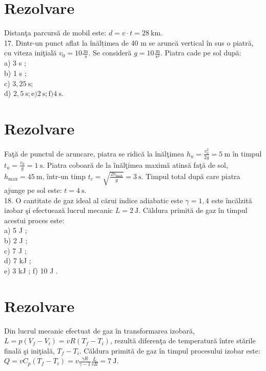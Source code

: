 \section*{Rezolvare}
Distanţa parcursă de mobil este: $d=v \cdot t=28 \mathrm{~km}$.\\
17. Dintr-un punct aflat la înălțimea de 40 m se aruncă vertical în sus o piatră, cu viteza iniţială $v_{0}=10 \frac{\mathrm{~m}}{\mathrm{~s}}$. Se consideră $g=10 \frac{\mathrm{~m}}{\mathrm{~s}^{2}}$. Piatra cade pe sol după:\\
a) 3 s ;\\
b) 1 s ;\\
c) $3,25 \mathrm{~s}$;\\
d) $2,5 \mathrm{~s} ; \mathrm{e}) 2 \mathrm{~s} ; \mathrm{f}) 4 \mathrm{~s}$.

\section*{Rezolvare}
Faţă de punctul de aruncare, piatra se ridică la înălţimea $h_{u}=\frac{v_{0}^{2}}{2 g}=5 \mathrm{~m}$ în timpul $t_{u}=\frac{v_{0}}{g}=1 \mathrm{~s}$. Piatra coboară de la înălţimea maximă atinsă faţă de sol, $h_{\max }=45 \mathrm{~m}$, într-un timp $t_{c}=\sqrt{\frac{2 h_{\max }}{g}}=3 \mathrm{~s}$. Timpul total după care piatra ajunge pe sol este: $t=4 \mathrm{~s}$.\\
18. O cantitate de gaz ideal al cărui indice adiabatic este $\gamma=1,4$ este încălzită izobar şi efectuează lucrul mecanic $L=2 \mathrm{~J}$. Căldura primită de gaz în timpul acestui proces este:\\
a) 5 J ;\\
b) 2 J ;\\
c) 7 J ;\\
d) 7 kJ ;\\
e) 3 kJ ; f) 10 J .

\section*{Rezolvare}
Din lucrul mecanic efectuat de gaz în transformarea izobară, $L=p\left(V_{f}-V_{i}\right)=v R\left(T_{f}-T_{i}\right)$, rezultă diferenţa de temperatură între stările finală şi iniţială, $T_{f}-T_{i}$. Căldura primită de gaz în timpul procesului izobar este: $Q=v C_{p}\left(T_{f}-T_{i}\right)=v \frac{\gamma R}{\gamma-1} \frac{L}{v R}=7 \mathrm{~J}$.

